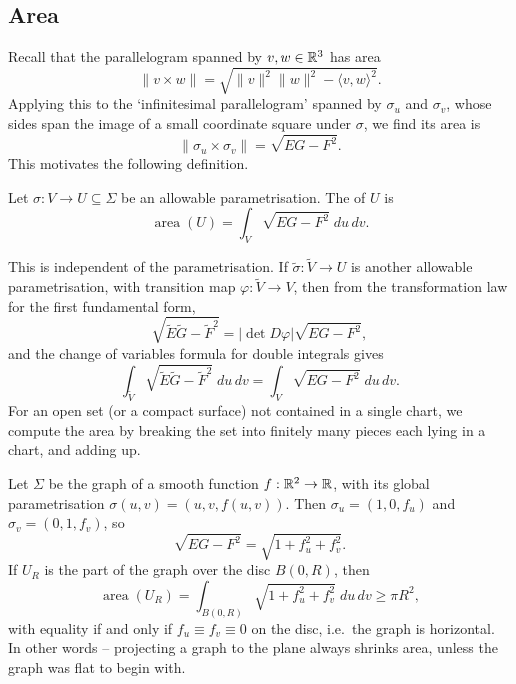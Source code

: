 \documentclass[a4paper]{scrartcl}
\begin{document}
\subsection{Area}

Recall that the parallelogram spanned by $v, w \in \mathbb{R}^3$ has area
$$
\|v \times w\| = \sqrt{\|v\|^2\|w\|^2 - \langle v, w\rangle^2}.
$$
Applying this to the `infinitesimal parallelogram' spanned by $\sigma_u$ and $\sigma_v$, whose sides span the image of a small coordinate square under $\sigma$, we find its area is
$$
\|\sigma_u \times \sigma_v\| = \sqrt{EG - F^2}.
$$
This motivates the following definition.

\begin{definition}[Area]
    Let $\sigma: V \rightarrow U \subseteq \Sigma$ be an allowable parametrisation. The  of $U$ is
    $$
    \operatorname{area}(U) = \int_V \sqrt{EG - F^2} \; du \, dv.
    $$
\end{definition}

\begin{remark}
    This is independent of the parametrisation. If $\tilde{\sigma}: \tilde{V} \rightarrow U$ is another allowable parametrisation, with transition map $\varphi: \tilde V \rightarrow V$, then from the transformation law for the first fundamental form,
    $$
    \sqrt{\tilde E \tilde G - \tilde F^2} = |{\det D\varphi}| \sqrt{EG - F^2},
    $$
    and the change of variables formula for double integrals gives
    $$
    \int_{\tilde V} \sqrt{\tilde E \tilde G - \tilde F^2} \; du \, dv = \int_V \sqrt{EG - F^2} \; du\,dv.
    $$
    For an open set (or a compact surface) not contained in a single chart, we compute the area by breaking the set into finitely many pieces each lying in a chart, and adding up.
\end{remark}

\begin{example}
    Let $\Sigma$ be the graph of a smooth function $f: \mathbb{R}^2 \rightarrow \mathbb{R}$, with its global parametrisation $\sigma(u, v) = (u, v, f(u, v))$. Then $\sigma_u = (1, 0, f_u)$ and $\sigma_v = (0, 1, f_v)$, so
    $$
    \sqrt{EG - F^2} = \sqrt{1 + f_u^2 + f_v^2}.
    $$
    If $U_R$ is the part of the graph over the disc $B(0, R)$, then
    $$
    \operatorname{area}(U_R) = \int_{B(0, R)} \sqrt{1 + f_u^2 + f_v^2} \; du \, dv \geq \pi R^2,
    $$
    with equality if and only if $f_u \equiv f_v \equiv 0$ on the disc, i.e.\ the graph is horizontal. In other words -- projecting a graph to the plane always shrinks area, unless the graph was flat to begin with.
\end{example}
\end{document}
